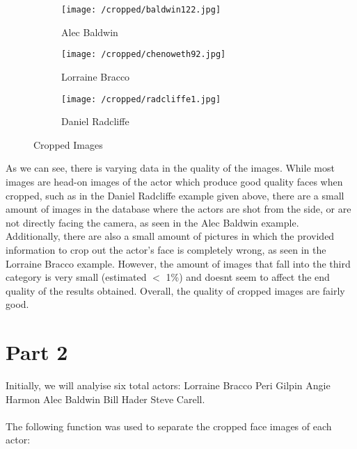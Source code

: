 \documentclass[11pt,a4paper]{report}
\begin{document}
\begin{figure}[h]
\centering
\begin{subfigure}{.3\textwidth}
  \centering
  \texttt{[image: /cropped/baldwin122.jpg]}
  \caption{Alec Baldwin}
  \label{fig:sub1}
\end{subfigure}%
\begin{subfigure}{.3\textwidth}
  \centering
  \texttt{[image: /cropped/chenoweth92.jpg]}
  \caption{Lorraine Bracco}
  \label{fig:sub2}
\end{subfigure}
\begin{subfigure}{.3\textwidth}
  \centering
  \texttt{[image: /cropped/radcliffe1.jpg]}
  \caption{Daniel Radcliffe}
  \label{fig:sub2}
\end{subfigure}
\caption{Cropped Images}
\label{fig:test}
\end{figure}	

As we can see, there is varying data in the quality of the images. While most images are head-on images of the actor which produce good quality faces when cropped, such as in the Daniel Radcliffe example given above, there are a small amount of images in the database where the actors are shot from the side, or are not directly facing the camera, as seen in the Alec Baldwin example. Additionally, there are also a small amount of pictures in which the provided information to crop out the actor's face is completely wrong, as seen in the Lorraine Bracco example. However, the amount of images that fall into the third category is very small (estimated $<$ 1\%) and doesnt seem to affect the end quality of the results obtained. Overall, the quality of cropped images are fairly good.

\section*{Part 2}
Initially, we will analyise six total actors: Lorraine Bracco Peri Gilpin Angie Harmon Alec Baldwin Bill Hader Steve Carell. \\\\
The following function was used to separate the cropped face images of each actor: 
\end{document}
